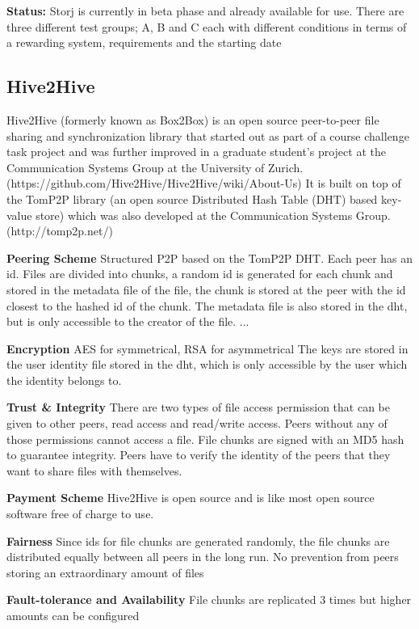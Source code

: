 \textbf{Status:} Storj is currently in beta phase and already available for use. There are three different test groups; A, B and C each with different conditions in terms of a rewarding system, requirements and the starting date \cite {storj:earlyaccess}

\subsection{Hive2Hive} %
Hive2Hive (formerly known as Box2Box) is an open source peer-to-peer file sharing and synchronization library that started out as part of a course challenge task project and was further improved in a graduate student's project at the Communication Systems Group at the University of Zurich. (https://github.com/Hive2Hive/Hive2Hive/wiki/About-Us) It is built on top of the TomP2P library (an open source Distributed Hash Table (DHT) based key-value store) which was also developed at the Communication Systems Group. (http://tomp2p.net/)

\textbf{Peering Scheme}
Structured P2P based on the TomP2P DHT. Each peer has an id. Files are divided into chunks, a random id is generated for each chunk and stored in the metadata file of the file, the chunk is stored at the peer with the id closest to the hashed id of the chunk. The metadata file is also stored in the dht, but is only accessible to the creator of the file. ...

\textbf{Encryption}
AES for symmetrical, RSA for asymmetrical
The keys are stored in the user identity file stored in the dht, which is only accessible by the user which the identity belongs to.

\textbf{Trust \& Integrity}
There are two types of file access permission that can be given to other peers, read access and read/write access. Peers without any of those permissions cannot access a file. File chunks are signed with an MD5 hash to guarantee integrity. Peers have to verify the identity of the peers that they want to share files with themselves.

\textbf{Payment Scheme}
Hive2Hive is open source and is like most open source software free of charge to use.

\textbf{Fairness}
Since ids for file chunks are generated randomly, the file chunks are distributed equally between all peers in the long run. No prevention from peers storing an extraordinary amount of files

\textbf{Fault-tolerance and Availability}
File chunks are replicated 3 times but higher amounts can be configured

